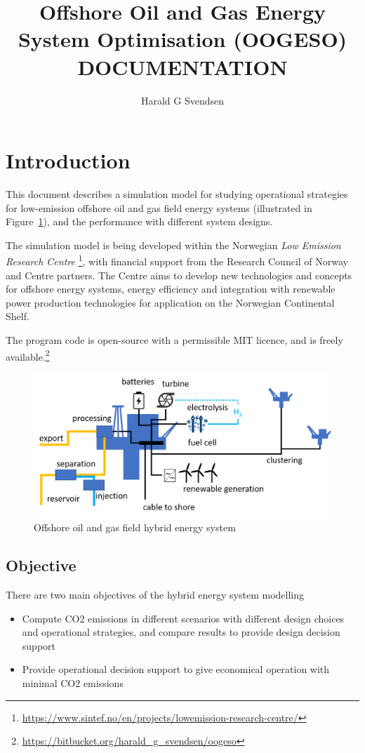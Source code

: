 \documentclass[12pt]{article}
\author{Harald G Svendsen}
\title{Offshore Oil and Gas Energy System Optimisation (OOGESO)\\ \textbf{DOCUMENTATION}}
\begin{document}
\maketitle



\tableofcontents

\newpage


\section{Introduction}
This document describes a simulation model for studying operational strategies for low-emission offshore oil and gas field energy systems (illustrated in Figure~\ref{fig:oilfield}), and the performance with different system designs.

The simulation model is being developed within the Norwegian \emph{Low Emission Research Centre}%
\footnote{\url{https://www.sintef.no/en/projects/lowemission-research-centre/}}, 
with financial support from the Research Council of Norway and Centre partners. 
The Centre aims to develop new technologies and concepts for offshore energy systems, energy efficiency and integration with renewable power production technologies for application on the Norwegian Continental Shelf.

The program code is open-source with a permissible MIT licence, and is freely available.\footnote{\url{https://bitbucket.org/harald_g_svendsen/oogeso}}


\begin{figure}
\centering
	\includegraphics[width=0.8\columnwidth]{media/oilfield.png}
\caption{Offshore oil and gas field hybrid energy system}
\label{fig:oilfield}
\end{figure}



\subsection{Objective}
There are two main objectives of the hybrid energy system modelling
\begin{itemize}
	\item Compute CO2 emissions in different scenarios with different design choices and operational strategies, and compare results to provide design decision support
	\item Provide operational decision support to give economical operation with minimal CO2 emissions
\end{itemize}
\end{document}
